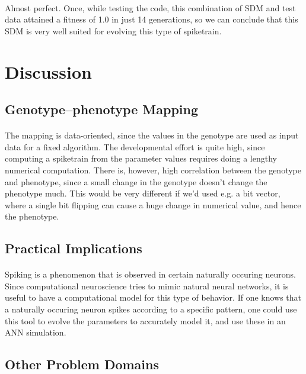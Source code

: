 \documentclass[a4paper,12pt]{article}
\begin{document}
\paragraph{}Almost perfect. Once, while testing the code, this combination of SDM and test data attained a fitness of 1.0 in just 14 generations, so we can conclude that this SDM is very well suited for evolving this type of spiketrain.

\section{Discussion}
\subsection{Genotype--phenotype Mapping}
\paragraph{}The mapping is data-oriented, since the values in the genotype are used as input data for a fixed algorithm. The developmental effort is quite high, since computing a spiketrain from the parameter values requires doing a lengthy numerical computation. There is, however, high correlation between the genotype and phenotype, since a small change in the genotype doesn't change the phenotype much. This would be very different if we'd used e.g. a bit vector, where a single bit flipping can cause a huge change in numerical value, and hence the phenotype.

\subsection{Practical Implications}
\paragraph{}Spiking is a phenomenon that is observed in certain naturally occuring neurons. Since computational neuroscience tries to mimic natural neural networks, it is useful to have a computational model for this type of behavior. If one knows that a naturally occuring neuron spikes according to a specific pattern, one could use this tool to evolve the parameters to accurately model it, and use these in an ANN simulation.

\subsection{Other Problem Domains}
\end{document}
